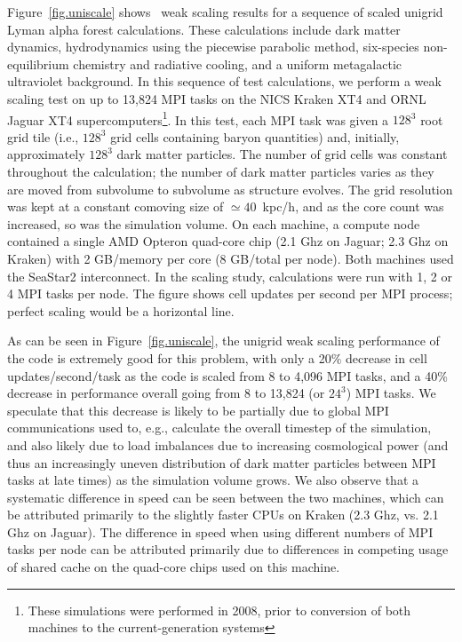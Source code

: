 Figure~\ref{fig.uniscale} shows \enzo\ weak scaling results for a
sequence of scaled unigrid Lyman alpha forest calculations. These
calculations include dark matter dynamics, hydrodynamics using the
piecewise parabolic method, six-species non-equilibrium chemistry and
radiative cooling, and a uniform metagalactic ultraviolet background.
In this sequence of test calculations, we perform a weak scaling test
on up to 13,824 MPI tasks on the NICS Kraken XT4 and ORNL Jaguar XT4
supercomputers\footnote{These simulations were performed in 2008,
prior to conversion of both machines to the current-generation
systems}.  In this test, each MPI task was given a $128^3$ root grid
tile (i.e., $128^3$ grid cells containing baryon quantities) and,
initially, approximately $128^3$ dark matter particles.  The number of
grid cells was constant throughout the calculation; the number of dark
matter particles varies as they are moved from subvolume to subvolume
as structure evolves.  The grid resolution was kept at a constant
comoving size of $\simeq 40$~kpc/h, and as the core count was
increased, so was the simulation volume.  On each machine, a compute
node contained a single AMD Opteron quad-core chip (2.1 Ghz on Jaguar;
2.3 Ghz on Kraken) with 2 GB/memory per core (8 GB/total per node).
Both machines used the SeaStar2 interconnect.  In the scaling study,
calculations were run with 1, 2 or 4 MPI tasks per node.  The figure
shows cell updates per second per MPI process; perfect scaling would
be a horizontal line.

As can be seen in Figure~\ref{fig.uniscale}, the unigrid weak scaling
performance of the code is extremely good for this problem, with only
a 20\% decrease in cell updates/second/task as the code is scaled from
8 to 4,096 MPI tasks, and a 40\% decrease in performance overall going
from 8 to 13,824 (or $24^3$) MPI tasks.  We speculate that this
decrease is likely to be partially due to global MPI communications
used to, e.g., calculate the overall timestep of the simulation, and
also likely due to load imbalances due to increasing cosmological
power (and thus an increasingly uneven distribution of dark matter
particles between MPI tasks at late times) as the simulation volume
grows.  We also observe that a systematic difference in speed can be
seen between the two machines, which can be attributed primarily to
the slightly faster CPUs on Kraken (2.3 Ghz, vs. 2.1 Ghz on Jaguar).
The difference in speed when using different numbers of MPI tasks per
node can be attributed primarily due to differences in competing usage
of shared cache on the quad-core chips used on this machine.


